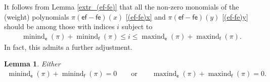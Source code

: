 \documentclass[pdftex]{sigma}
\numberwithin{equation}{section}
\newtheorem{Lemma}[Theorem]{Lemma}
\begin{document}
It follows from Lemma \ref{extr_(ef-fe)} that all the non-zero monomials of the (weight) polynomials $\pi(\mathsf{ef}-\mathsf{fe})(x)$ \eqref{(ef-fe)x} and $\pi(\mathsf{ef}-\mathsf{fe})(y)$ \eqref{(ef-fe)y} should be among those with indices $i$ subject to
\begin{gather*}
\operatorname{minind}_\mathsf{e}(\pi)+
\operatorname{minind}_\mathsf{f}(\pi)\le i\le\operatorname{maxind}_\mathsf{e}(\pi)+
\operatorname{maxind}_\mathsf{f}(\pi).
\end{gather*}
In fact, this admits a further adjustment.

\begin{Lemma}\label{0ep}
Either
\begin{gather*}
\operatorname{minind}_\mathsf{e}(\pi)+\operatorname{minind}_\mathsf{f}(\pi)=0
\qquad \text{or} \qquad \operatorname{maxind}_\mathsf{e}(\pi)+\operatorname{maxind}_\mathsf{f}(\pi)=0.
\end{gather*}
\end{Lemma}
\end{document}
